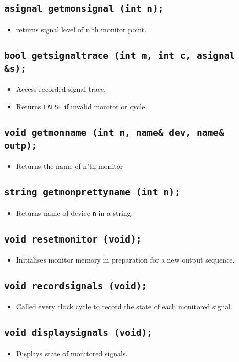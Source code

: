\documentclass[a4paper,11pt]{article}  %
\begin{document}
\subsection*{\texttt{asignal getmonsignal (int n);}}
\begin{itemize}
  \item returns signal level of n'th monitor point.
\end{itemize}

\subsection*{\texttt{bool getsignaltrace (int m, int c, asignal \&s);}}
\begin{itemize}
  \item Access recorded signal trace.
  \item Returns \texttt{FALSE} if invalid monitor or cycle.
\end{itemize}

\subsection*{\texttt{void getmonname (int n, name\& dev, name\& outp);}}
\begin{itemize}
  \item Returns the name of n'th monitor
\end{itemize}

\subsection*{\texttt{string getmonprettyname (int n);}}
\begin{itemize}
  \item Returns name of device \texttt{n} in a string.
\end{itemize}


\subsection*{\texttt{void resetmonitor (void);}}
\begin{itemize}
  \item Initialises monitor memory in preparation for a new output
    sequence.
\end{itemize}

\subsection*{\texttt{void recordsignals (void);}}
\begin{itemize}
  \item Called every clock cycle to record the state of each monitored
    signal.
\end{itemize}

\subsection*{\texttt{void displaysignals (void);}}
\begin{itemize}
  \item Displays state of monitored signals.
\end{itemize}
\end{document}
